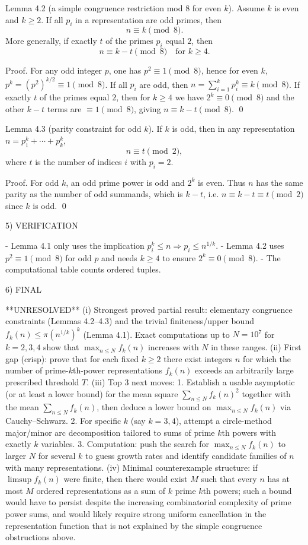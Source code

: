 Lemma 4.2 (a simple congruence restriction mod $8$ for even $k$).
Assume $k$ is even and $k\ge 2$. If all $p_i$ in a representation are odd primes, then
\[
n\equiv k\pmod 8.
\]
More generally, if exactly $t$ of the primes $p_i$ equal $2$, then
\[
n\equiv k-t\pmod 8\quad\text{for }k\ge 4.
\]

Proof.
For any odd integer $p$, one has $p^2\equiv 1\pmod 8$, hence for even $k$,
$p^k=(p^2)^{k/2}\equiv 1\pmod 8$.
If all $p_i$ are odd, then $n=\sum_{i=1}^k p_i^k\equiv k\pmod 8$.
If exactly $t$ of the primes equal $2$, then for $k\ge 4$ we have $2^k\equiv 0\pmod 8$ and the other $k-t$ terms are $\equiv 1\pmod 8$, giving $n\equiv k-t\pmod 8$. \qed

Lemma 4.3 (parity constraint for odd $k$).
If $k$ is odd, then in any representation $n=p_1^k+\cdots+p_k^k$,
\[
n\equiv t\pmod 2,
\]
where $t$ is the number of indices $i$ with $p_i=2$.

Proof.
For odd $k$, an odd prime power is odd and $2^k$ is even. Thus $n$ has the same parity as the number of odd summands, which is $k-t$, i.e. $n\equiv k-t\equiv t\pmod 2$ since $k$ is odd. \qed

5) VERIFICATION

- Lemma 4.1 only uses the implication $p_i^k\le n\Rightarrow p_i\le n^{1/k}$.
- Lemma 4.2 uses $p^2\equiv 1\pmod 8$ for odd $p$ and needs $k\ge 4$ to ensure $2^k\equiv 0\pmod 8$.
- The computational table counts ordered tuples.

6) FINAL

**UNRESOLVED**
(i) Strongest proved partial result: elementary congruence constraints (Lemmas 4.2--4.3) and the trivial finiteness/upper bound $f_k(n)\le \pi(n^{1/k})^k$ (Lemma 4.1). Exact computations up to $N=10^7$ for $k=2,3,4$ show that $\max_{n\le N} f_k(n)$ increases with $N$ in these ranges.
(ii) First gap (crisp): prove that for each fixed $k\ge 2$ there exist integers $n$ for which the number of prime-$k$th-power representations $f_k(n)$ exceeds an arbitrarily large prescribed threshold $T$.
(iii) Top 3 next moves:
  1. Establish a usable asymptotic (or at least a lower bound) for the mean square $\sum_{n\le N} f_k(n)^2$ together with the mean $\sum_{n\le N} f_k(n)$, then deduce a lower bound on $\max_{n\le N} f_k(n)$ via Cauchy--Schwarz.
  2. For specific $k$ (say $k=3,4$), attempt a circle-method major/minor arc decomposition tailored to sums of prime $k$th powers with exactly $k$ variables.
  3. Computation: push the search for $\max_{n\le N} f_k(n)$ to larger $N$ for several $k$ to guess growth rates and identify candidate families of $n$ with many representations.
(iv) Minimal counterexample structure: if $\limsup f_k(n)$ were finite, then there would exist $M$ such that every $n$ has at most $M$ ordered representations as a sum of $k$ prime $k$th powers; such a bound would have to persist despite the increasing combinatorial complexity of prime power sums, and would likely require strong uniform cancellation in the representation function that is not explained by the simple congruence obstructions above.



